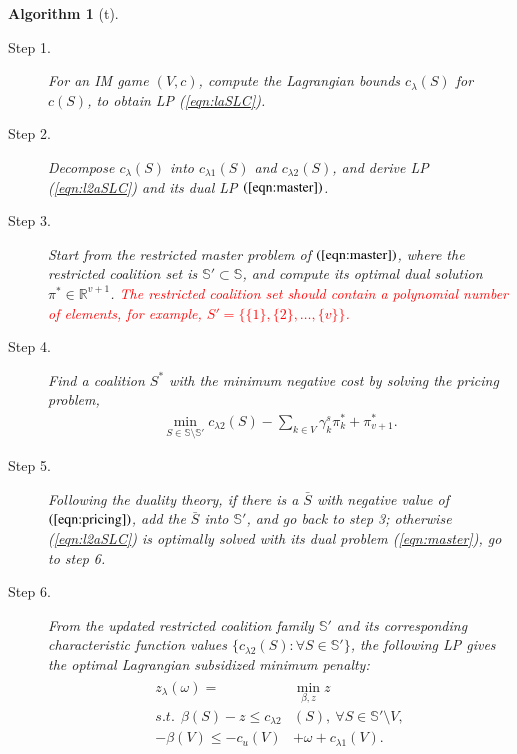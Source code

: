 \documentclass[authoryear,review,12pt]{elsarticle}
\newtheorem{algorithm}{Algorithm}
\newcommand{\R}{\mathbb{R}}
\begin{document}
\renewcommand{\baselinestretch}{1.5}
\begin{algorithm}[t]
\caption{LRB Algorithm to Compute $z_{\lambda}(\omega)$}
\label{alg:SPC}
\begin{description}
\item[Step 1.] For an IM game $(V,c)$, compute the Lagrangian bounds $c_{\lambda}(S)$ for $c(S)$, to obtain LP (\ref{eqn:laSLC}).

\item[Step 2.] Decompose $c_{\lambda}(S)$ into $c_{\lambda 1}(S)$ and $c_{\lambda 2}(S)$, and derive LP (\ref{eqn:l2aSLC}) and its dual LP $(\ref{eqn:master})$.

\item[Step 3.] Start from the restricted master problem of $(\ref{eqn:master})$,
where the restricted coalition set is $\mathbb{S}' \subset \mathbb{S}$, and compute its optimal dual solution $\pi^{*} \in \R^{v+1}$. \textcolor{red}{
The restricted coalition set should contain a polynomial number of elements, for example, $S' = \{\{1\},\{2\},\ldots, \{v\}\}$.}
\item[Step 4.] Find a coalition $S^*$ with the minimum negative cost by solving the pricing problem,
\begin{eqnarray}\label{eqn:pricing}
\min_{S\in \mathbb{S}\setminus \mathbb{S}'} c_{\lambda2}(S) - \sum_{ k \in V} \gamma^s_k \pi_{k}^{*} + \pi_{v+1}^*.
\end{eqnarray}
\item[Step 5.] Following the duality theory, if there is a $\bar{S}$ with negative value of $(\ref{eqn:pricing})$, add the $\bar{S}$ into $\mathbb{S}'$, and go back to step 3; otherwise (\ref{eqn:l2aSLC}) is optimally solved with its dual problem (\ref{eqn:master}), go to step 6.

\item[Step 6.] From the updated restricted coalition family $\mathbb{S}'$ and its corresponding characteristic function values $\{c_{\lambda2}(S):\forall S \in \mathbb{S}' \}$, the following LP gives the optimal Lagrangian subsidized minimum penalty:
\begin{eqnarray}\label{eqn:alpha2}
\begin{aligned}
z_{\lambda}(\omega) = &\min_{\beta,z} z\\
s.t.~~ \beta(S) - z \leq  c_{\lambda2}&(S),~ \forall S \in \mathbb{S}' \setminus V,\\
-\beta(V) \leq  -c_u(V) &+ \omega  + c_{\lambda1}(V).
\end{aligned}
\end{eqnarray}
\vspace{-8mm}
\end{description}
\end{algorithm}
\end{document}
